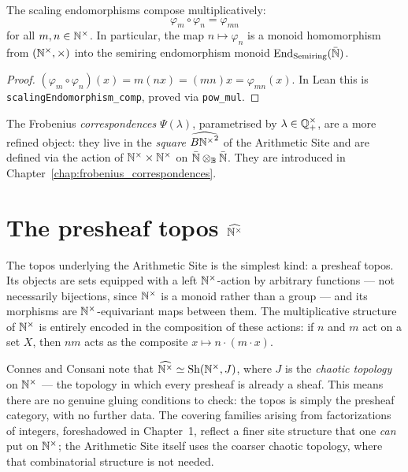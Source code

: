 \begin{lemma}[label=lem:scaling_comp, uses=def:scaling_action]
  \label{lem:scaling_comp}\leanok
  The scaling endomorphisms compose multiplicatively:
  \[
    \varphi_m \circ \varphi_n = \varphi_{mn}
  \]
  for all $m, n \in \mathbb{N}^{\times}$.  In particular, the map $n \mapsto \varphi_n$
  is a monoid homomorphism from $(\mathbb{N}^{\times}, \times)$ into the semiring
  endomorphism monoid $\mathrm{End}_{\mathrm{Semiring}}(\bar{\mathbb{N}})$.
\end{lemma}
\begin{proof}
  $(\varphi_m \circ \varphi_n)(x) = m(nx) = (mn)x = \varphi_{mn}(x)$.
  In Lean this is \texttt{scalingEndomorphism\_comp}, proved via
  \texttt{pow\_mul}.
\end{proof}

\begin{remark}
  The Frobenius \emph{correspondences} $\Psi(\lambda)$, parametrised by
  $\lambda \in \mathbb{Q}^{\times}_{+}$, are a more refined object: they live in the
  \emph{square} $\widehat{B{\mathbb{N}^{\times}}^2}$ of the Arithmetic Site and are
  defined via the action of $\mathbb{N}^{\times} \times \mathbb{N}^{\times}$ on
  $\bar{\mathbb{N}} \otimes_{\mathbb{B}} \bar{\mathbb{N}}$.  They are introduced in
  Chapter~\ref{chap:frobenius_correspondences}.
\end{remark}

\chapter{The presheaf topos \texorpdfstring{$\widehat{\mathbb{N}^{\times}}$}{PSh(N+)}}
\label{chap:presheaf_topos}

The topos underlying the Arithmetic Site is the simplest kind: a
presheaf topos.  Its objects are sets equipped with a left
$\mathbb{N}^{\times}$-action by arbitrary functions --- not necessarily bijections,
since $\mathbb{N}^{\times}$ is a monoid rather than a group --- and its morphisms are
$\mathbb{N}^{\times}$-equivariant maps between them.  The multiplicative structure of
$\mathbb{N}^{\times}$ is entirely encoded in the composition of these actions: if $n$
and $m$ act on a set $X$, then $nm$ acts as the composite $x \mapsto
n \cdot (m \cdot x)$.

Connes and Consani note that $\widehat{\mathbb{N}^{\times}} \simeq
\mathrm{Sh}(\mathbb{N}^{\times}, J)$, where $J$ is the \emph{chaotic topology} on
$\mathbb{N}^{\times}$ --- the topology in which every presheaf is already a sheaf.
This means there are no genuine gluing conditions to check: the topos is
simply the presheaf category, with no further data.  The covering
families arising from factorizations of integers, foreshadowed in
Chapter~1, reflect a finer site structure that one \emph{can} put on
$\mathbb{N}^{\times}$; the Arithmetic Site itself uses the coarser chaotic topology,
where that combinatorial structure is not needed.


